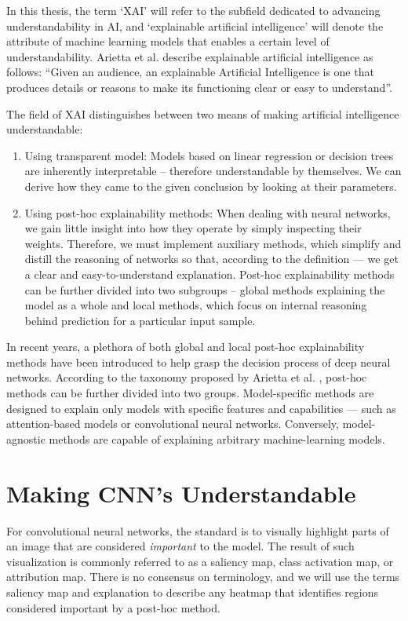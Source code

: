 In this thesis, the term `XAI' will refer to the subfield dedicated to advancing understandability in AI, and `explainable artificial intelligence' will denote the attribute of machine learning models that enables a certain level of understandability.
Arietta et al. \cite{arrieta-taxonomy} describe explainable artificial intelligence as follows: ``Given an audience, an explainable Artificial Intelligence is one that produces details or reasons to make its functioning clear or easy to understand''.

The field of XAI distinguishes between two means of making artificial intelligence understandable:
\begin{enumerate}
    \item Using transparent model: Models based on linear regression or decision trees are inherently interpretable -- therefore understandable by themselves. We can derive how they came to the given conclusion by looking at their parameters.
    \item Using post-hoc explainability methods: When dealing with neural networks, we gain little insight into how they operate by simply inspecting their weights. Therefore, we must implement auxiliary methods, which simplify and distill the reasoning of networks so that, according to the definition --- we get a clear and easy-to-understand explanation. Post-hoc explainability methods can be further divided into two subgroups -- global methods explaining the model as a whole and local methods, which focus on internal reasoning behind prediction for a particular input sample.
\end{enumerate}

In recent years, a plethora of both global and local post-hoc explainability methods have been introduced to help grasp the decision process of deep neural networks.
According to the taxonomy proposed by Arietta et al. \cite{arrieta-taxonomy}, post-hoc methods can be further divided into two groups. 
Model-specific methods are designed to explain only models with specific features and capabilities --- such as attention-based models or convolutional neural networks.
Conversely, model-agnostic methods are capable of explaining arbitrary machine-learning models.

\section{Making CNN's Understandable}\label{sec:xai-cnn}

For convolutional neural networks, the standard is to visually highlight parts of an image that are considered \emph{important} to the model.
The result of such visualization is commonly referred to as a saliency map, class activation map, or attribution map.
There is no consensus on terminology, and we will use the terms saliency map and explanation to describe any heatmap that identifies regions considered important by a post-hoc method.

